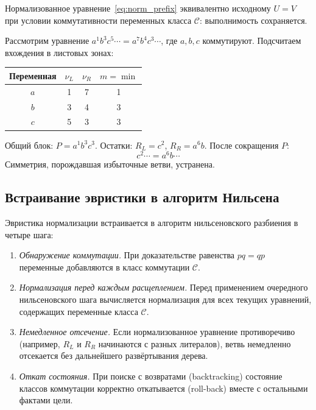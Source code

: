 \documentclass[14pt, russian]{scrartcl}
\begin{document}
\begin{Lemma}
Нормализованное уравнение~\eqref{eq:norm_prefix} эквивалентно исходному
$U = V$ при условии коммутативности переменных класса $\mathcal{C}$:
выполнимость сохраняется.
\end{Lemma}

\begin{Example}
Рассмотрим уравнение $a^1 b^3 c^5 \cdots = a^7 b^4 c^3 \cdots$, где $a, b, c$
коммутируют. Подсчитаем вхождения в листовых зонах:

\begin{center}
\begin{tabular}{|c|c|c|c|}
\hline
Переменная & $\nu_L$ & $\nu_R$ & $m = \min$ \\
\hline
$a$ & 1 & 7 & 1 \\
$b$ & 3 & 4 & 3 \\
$c$ & 5 & 3 & 3 \\
\hline
\end{tabular}
\end{center}

Общий блок: $P = a^1 b^3 c^3$. Остатки: $R_L = c^2$, $R_R = a^6 b$.
После сокращения $P$:
\[
c^2 \cdots = a^6 b \cdots
\]
Симметрия, порождавшая избыточные ветви, устранена.
\end{Example}

\subsection{Встраивание эвристики в алгоритм Нильсена}

Эвристика нормализации встраивается в алгоритм нильсеновского разбиения
в четыре шага:

\begin{enumerate}
\item \emph{Обнаружение коммутации.} При доказательстве равенства $pq = qp$
  переменные добавляются в класс коммутации $\mathcal{C}$.
\item \emph{Нормализация перед каждым расщеплением.} Перед применением
  очередного нильсеновского шага вычисляется нормализация для всех текущих
  уравнений, содержащих переменные класса $\mathcal{C}$.
\item \emph{Немедленное отсечение.} Если нормализованное уравнение противоречиво
  (например, $R_L$ и $R_R$ начинаются с разных литералов), ветвь немедленно
  отсекается без дальнейшего развёртывания дерева.
\item \emph{Откат состояния.} При поиске с возвратами (backtracking) состояние
  классов коммутации корректно откатывается (roll-back) вместе с остальными
  фактами цели.
\end{enumerate}
\end{document}
